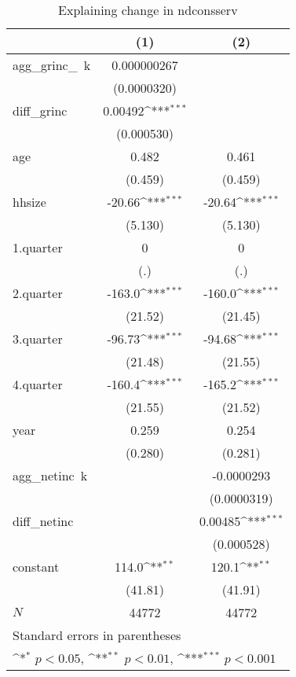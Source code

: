 \begin{table}[htbp]\centering
\def\sym#1{\ifmmode^{#1}\else\(^{#1}\)\fi}
\caption{\label{ndconsserv\_deltainc} Explaining change in ndconsserv}
\begin{tabular}{l*{2}{c}}
\hline\hline
            &\multicolumn{1}{c}{(1)}         &\multicolumn{1}{c}{(2)}         \\
\hline
agg\_grinc\_~k& 0.000000267         &                     \\
            & (0.0000320)         &                     \\
diff\_grinc  &     0.00492\sym{***}&                     \\
            &  (0.000530)         &                     \\
age         &       0.482         &       0.461         \\
            &     (0.459)         &     (0.459)         \\
hhsize      &      -20.66\sym{***}&      -20.64\sym{***}\\
            &     (5.130)         &     (5.130)         \\
1.quarter   &           0         &           0         \\
            &         (.)         &         (.)         \\
2.quarter   &      -163.0\sym{***}&      -160.0\sym{***}\\
            &     (21.52)         &     (21.45)         \\
3.quarter   &      -96.73\sym{***}&      -94.68\sym{***}\\
            &     (21.48)         &     (21.55)         \\
4.quarter   &      -160.4\sym{***}&      -165.2\sym{***}\\
            &     (21.55)         &     (21.52)         \\
year        &       0.259         &       0.254         \\
            &     (0.280)         &     (0.281)         \\
agg\_netinc~k&                     &  -0.0000293         \\
            &                     & (0.0000319)         \\
diff\_netinc &                     &     0.00485\sym{***}\\
            &                     &  (0.000528)         \\
constant    &       114.0\sym{**} &       120.1\sym{**} \\
            &     (41.81)         &     (41.91)         \\
\hline
\(N\)       &       44772         &       44772         \\
\hline\hline
\multicolumn{3}{l}{\footnotesize Standard errors in parentheses}\\
\multicolumn{3}{l}{\footnotesize \sym{*} \(p<0.05\), \sym{**} \(p<0.01\), \sym{***} \(p<0.001\)}\\
\end{tabular}
\end{table}
